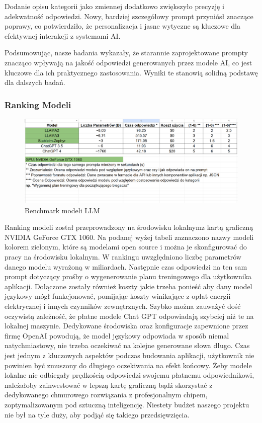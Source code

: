 Dodanie opisu kategorii jako zmiennej dodatkowo zwiększyło precyzję i adekwatność odpowiedzi. Nowy, bardziej szczegółowy prompt przyniósł znaczące poprawy, co potwierdziło, że personalizacja i jasne wytyczne są kluczowe dla efektywnej interakcji z systemami AI.

Podsumowując, nasze badania wykazały, że starannie zaprojektowane prompty znacząco wpływają na jakość odpowiedzi generowanych przez modele AI, co jest kluczowe dla ich praktycznego zastosowania. Wyniki te stanowią solidną podstawę dla dalszych badań.

\subsubsection{Ranking Modeli}

\begin{figure}[H]
    \centering
    \includegraphics[width=1\textwidth]{Obrazy/llms_benchmark.png}
    \caption{Benchmark modeli LLM}
    \label{fig:my_label}
\end{figure}

Ranking modeli został przeprowadzony na środowisku lokalnym\linebreak z kartą graficzną NVIDIA GeForce GTX 1060. Na podanej wyżej tabeli zaznaczono nazwy modeli kolorem zielonym, które są modelami open source i można je skonfigurować do pracy na środowisku lokalnym. W rankingu uwzględniono liczbę parametrów danego modelu wyrażoną w miliardach. Następnie czas odpowiedzi na ten sam prompt dotyczący prośby o wygenerowanie planu treningowego dla użytkownika aplikacji. Dołączone zostały również koszty jakie trzeba ponieść aby dany model językowy mógł funkcjonować, pomijając koszty winikające z opłat energii elektrycznej i innych czynników zewnętrznych. Szybko można zauważyć dość oczywistą zależność, że płatne modele Chat GPT odpowiadają szybciej niż te na lokalnej maszynie. Dedykowane środowiska oraz konfiguracje zapewnione przez firmę OpenAI powodują, że model językowy odpowiada w sposób niemal natychmiastowy, nie trzeba oczekiwać na kolejne generowane słowa długo. Czas jest jednym z kluczowych aspektów podczas budowania aplikacji, użytkownik nie powinien być zmuszony do długiego oczekiwania na efekt końcowy. Żeby modele lokalne nie odbiegały prędkością odpowiedzi swojemu płatnemu odpowiednikowi, należałoby zainwestować w lepszą kartę graficzną bądź skorzystać \linebreak z dedykowanego chmurowego rozwiązania z profesjonalnym chipem, zoptymalizowanym pod sztuczną inteligencję. Niestety budżet naszego projektu nie był na tyle duży, aby podjąć się takiego przedsięwzięcia.
\\

